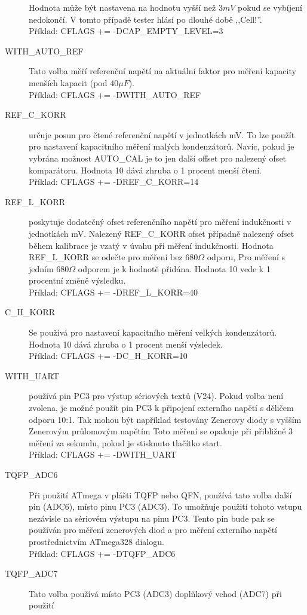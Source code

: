 \begin{description}
Hodnota může být nastavena na hodnotu vyšší než \(3mV\) pokud se vybíjení nedokončí.
V tomto případě tester hlásí po dlouhé době ,,Cell!''.\\
Příklad: CFLAGS += -DCAP\_EMPTY\_LEVEL=3
  \item[WITH\_AUTO\_REF] Tato volba měří referenční napětí na aktuální faktor pro měření kapacity
menších kapacit (pod \(40\mu F\)).\\
Příklad: CFLAGS += -DWITH\_AUTO\_REF
  \item[REF\_C\_KORR] určuje posun pro čtené referenční napětí v jednotkách mV.
To lze použít pro nastavení kapacitního měření malých kondenzátorů.
Navíc, pokud je vybrána možnost AUTO\_CAL je to jen další offset pro
nalezený ofset komparátoru.
Hodnota 10 dává zhruba o 1 procent menší čtení.\\
Příklad: CFLAGS += -DREF\_C\_KORR=14
  \item[REF\_L\_KORR] poskytuje dodatečný ofset referenčního napětí pro měření indukčnosti
v jednotkách mV. Nalezený REF\_C\_KORR ofset případně nalezený ofset během kalibrace
je vzatý v úvahu při měření indukčnosti.
Hodnota REF\_L\_KORR se odečte pro měření bez \(680\Omega\) odporu,
Pro měření s jedním \(680\Omega\) odporem je  k hodnotě přidána.
Hodnota 10 vede k 1 procentní změně výsledku.\\
Příklad: CFLAGS += -DREF\_L\_KORR=40
  \item[C\_H\_KORR] Se používá pro nastavení kapacitního měření velkých kondenzátorů.
Hodnota 10 dává zhruba o 1 procent menší výsledek.\\
Příklad: CFLAGS += -DC\_H\_KORR=10
  \item[WITH\_UART] používá pin PC3 pro výstup sériových textů (V24). Pokud volba není zvolena,
je možné použít pin PC3 k připojení externího napětí s děličem odporu 10:1.
Tak mohou být například testovány Zenerovy diody s vyšším Zenerovým průlomovým napětím
Toto měření se opakuje při přibližně 3 měření za sekundu, pokud je stisknuto tlačítko start.\\
Příklad: CFLAGS += -DWITH\_UART
  \item[TQFP\_ADC6] Při použití ATmega v plášti TQFP nebo QFN, používá tato volba další pin (ADC6),
místo pinu PC3 (ADC3).
To umožňuje použití tohoto vstupu nezávisle na sériovém výstupu na pinu PC3.
Tento pin bude pak se používán pro měření zenerových diod a pro měření externího napětí
prostřednictvím  ATmega328 dialogu.\\
Příklad: CFLAGS += -DTQFP\_ADC6
  \item[TQFP\_ADC7] Tato volba používá místo PC3 (ADC3) doplňkový vchod (ADC7) při použití

\end{description}
